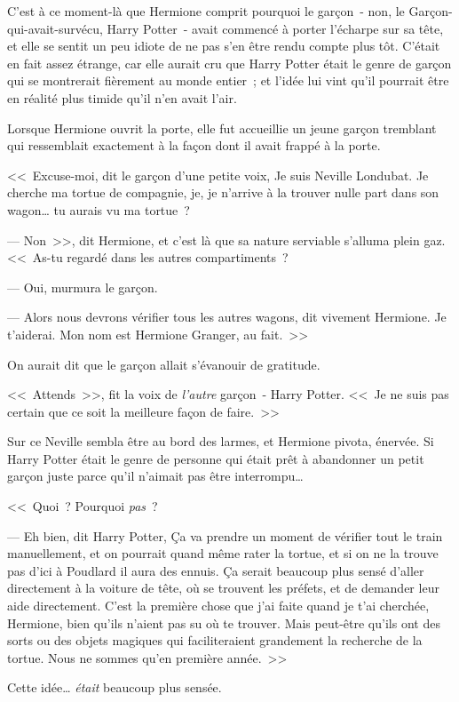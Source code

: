 C'est à ce moment-là que Hermione comprit pourquoi le garçon~- non, le Garçon-qui-avait-survécu, Harry Potter~- avait commencé à porter l'écharpe sur sa tête, et elle se sentit un peu idiote de ne pas s'en être rendu compte plus tôt. C'était en fait assez étrange, car elle aurait cru que Harry Potter était le genre de garçon qui se montrerait fièrement au monde entier~; et l'idée lui vint qu'il pourrait être en réalité plus timide qu'il n'en avait l'air.

Lorsque Hermione ouvrit la porte, elle fut accueillie un jeune garçon tremblant qui ressemblait exactement à la façon dont il avait frappé à la porte.

<<~Excuse-moi, dit le garçon d'une petite voix, Je suis Neville Londubat. Je cherche ma tortue de compagnie, je, je n'arrive à la trouver nulle part dans son wagon… tu aurais vu ma tortue~?

--- Non~>>, dit Hermione, et c'est là que sa nature serviable s'alluma plein gaz. <<~As-tu regardé dans les autres compartiments~?

--- Oui, murmura le garçon.

--- Alors nous devrons vérifier tous les autres wagons, dit vivement Hermione. Je t'aiderai. Mon nom est Hermione Granger, au fait.~>>

On aurait dit que le garçon allait s'évanouir de gratitude.

<<~Attends~>>, fit la voix de \emph{l'autre} garçon~- Harry Potter. <<~Je ne suis pas certain que ce soit la meilleure façon de faire.~>>

Sur ce Neville sembla être au bord des larmes, et Hermione pivota, énervée. Si Harry Potter était le genre de personne qui était prêt à abandonner un petit garçon juste parce qu'il n'aimait pas être interrompu…

<<~Quoi~? Pourquoi \emph{pas}~?

--- Eh bien, dit Harry Potter, Ça va prendre un moment de vérifier tout le train manuellement, et on pourrait quand même rater la tortue, et si on ne la trouve pas d'ici à Poudlard il aura des ennuis. Ça serait beaucoup plus sensé d'aller directement à la voiture de tête, où se trouvent les préfets, et de demander leur aide directement. C'est la première chose que j'ai faite quand je t'ai cherchée, Hermione, bien qu'ils n'aient pas su où te trouver. Mais peut-être qu'ils ont des sorts ou des objets magiques qui faciliteraient grandement la recherche de la tortue. Nous ne sommes qu'en première année.~>>

Cette idée… \emph{était} beaucoup plus sensée.

